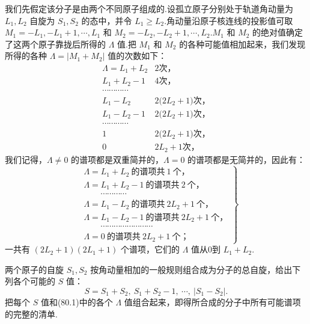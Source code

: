 我们先假定该分子是由两个不同原子组成的.设孤立原子分别处于轨道角动量为 $L_1,L_2$ 自旋为 $S_1,S_2$ 的态中，并令 $L_1\geqslant L_2$.角动量沿原子核连线的投影值可取 $M_1=-L_1,-L_1+1,\cdots,L_1$ 和 $M_2=-L_2,-L_2+1,\cdots,L_2$.$M_1$ 和 $M_2$ 的绝对值确定了这两个原子靠拢后所得的 $\Lambda$ 值.把 $M_1$ 和 $M_2$ 的各种可能值相加起来，我们发现所得的各种 $\Lambda=|M_1+M_2|$ 值的次数如下：
\begin{equation*}
\begin{array}{rl}
  \Lambda=L_1+L_2 & \text{2次，}\\
  L_1+L_2-1 & \text{4次，}\\
  \cdots\cdots\cdots\cdots \\
  L_1-L_2 & \text{2(}2L_2+1\text{)次，}\\
  L_1-L_2-1 & \text{2(}2L_2+1\text{)次，}\\
  \cdots\cdots\cdots\cdots \\
  1 & \text{2(}2L_2+1\text{)次，}\\
  0 & \text{2}L_2+1\text{次，}
\end{array}
\end{equation*}
我们记得，$\Lambda\neq0$ 的谱项都是双重简并的，$\Lambda=0$ 的谱项都是无简并的，因此有：
\begin{equation}
\left.\begin{aligned}
  &\Lambda=L_1+L_2\ \text{的谱项共}\ 1\ \text{个，}\\
  &\Lambda=L_1+L_2-1\ \text{的谱项共}\ 2\ \text{个，}\\
  &\qquad\cdots\cdots\cdots\cdots\\
  &\Lambda=L_1-L_2\ \text{的谱项共}\ 2L_2+1\ \text{个，}\\
  &\Lambda=L_1-L_2-1\ \text{的谱项共}\ 2L_2+1\ \text{个，}\\
  &\qquad\cdots\cdots\cdots\cdots\cdots\cdots\cdots\cdots\\
  &\Lambda=0\ \text{的谱项共}\ 2L_2+1\ \text{个；}
\end{aligned}\right\}
\end{equation}
一共有 $(2L_2+1)(2L_1+1)$ 个谱项，它们的 $\Lambda$ 值从0到 $L_1+L_2$.

两个原子的自旋 $S_1,S_2$ 按角动量相加的一般规则组合成为分子的总自旋，给出下列各个可能的 $S$ 值：
\begin{equation}
  S=S_1+S_2,\ S_1+S_2-1,\ \cdots,\ |S_1-S_2|.
\end{equation}
把每个 $S$ 值和(80.1)中的各个 $\Lambda$ 值组合起来，即得所合成的分子中所有可能谱项的完整的清单.

